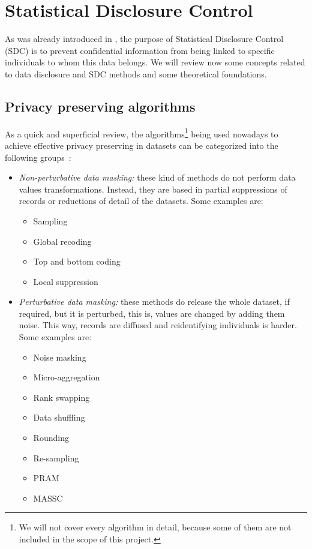 \section{Statistical Disclosure Control}
\label{Theory::SDC}

As was already introduced in , the purpose of Statistical Disclosure Control (SDC) is to prevent confidential information from being linked to specific individuals to whom this data belongs. We will review now some concepts related to data disclosure and SDC methods and some theoretical foundations.

\subsection{Privacy preserving algorithms} 
\label{Theory::SDC::Algorithms}

As a quick and superficial review, the algorithms\footnote{We will not cover every algorithm in detail, because some of them are not included in the scope of this project.} being used nowadays to achieve effective privacy preserving in datasets can be categorized into the following groups~\cite{Hundepool:StatisticalDisclosureControl}:

\begin{itemize}
	\item \textit{Non-perturbative data masking:} these kind of methods do not perform data values transformations. Instead, they are based in partial suppressions of records or reductions of detail of the datasets. Some examples are:
	\begin{itemize}
		\item Sampling
		\item Global recoding
		\item Top and bottom coding
		\item Local suppression
	\end{itemize}

	\item \textit{Perturbative data masking:} these methods do release the whole dataset, if required, but it is perturbed, this is, values are changed by adding them noise. This way, records are diffused and reidentifying individuals is harder. Some examples are:
	\begin{itemize}
		\item Noise masking
		\item Micro-aggregation
		\item Rank swapping
		\item Data shuffling
		\item Rounding
		\item Re-sampling
		\item PRAM
		\item MASSC
	\end{itemize}
\end{itemize}

